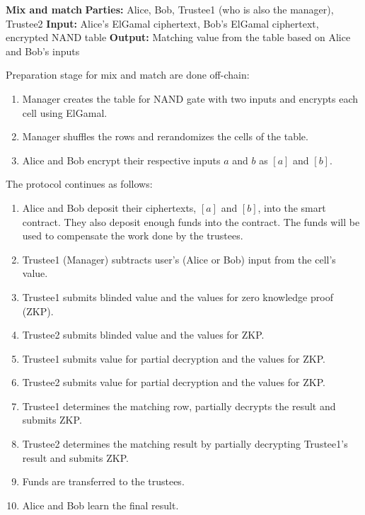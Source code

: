 \begin{mdframed}
 	\textbf{Mix and match}
 	\newline
 	 \newline
 	\textbf{Parties: } Alice, Bob, Trustee1 (who is also the manager), Trustee2 
 	 \newline
 	\textbf{Input: } Alice's ElGamal ciphertext, Bob's ElGamal ciphertext, encrypted NAND table 
 	\newline
 	\textbf{Output: } Matching value from the table based on Alice and Bob's inputs
 	\newline
 	
	Preparation stage for mix and match are done off-chain:
	\begin{enumerate}
		\item Manager creates the table for NAND gate with two inputs and encrypts each cell using ElGamal. 
		\item Manager shuffles the rows and rerandomizes the cells of the table.
		\item Alice and Bob encrypt their respective inputs $a$ and $b$ as $[a]$ and $[b]$.
	\end{enumerate}

 	The protocol continues as follows:
 	\begin{enumerate}
 		\item Alice and Bob deposit their ciphertexts, $[a]$ and $[b]$, into the smart contract. They also deposit enough funds into the contract. The funds will be used to compensate the work done by the trustees.
 		\item Trustee1 (Manager) subtracts user's (Alice or Bob) input from the cell's value.
 		\item Trustee1 submits blinded value and the values for zero knowledge proof (ZKP).
 		\item Trustee2 submits blinded value and the values for ZKP.
 		\item Trustee1 submits value for partial decryption and the values for ZKP.
 		\item Trustee2 submits value for partial decryption and the values for ZKP.
 		\item Trustee1 determines the matching row, partially decrypts the result and submits ZKP.
 		\item Trustee2  determines the matching result by partially decrypting Trustee1's result and submits ZKP.
 		\item Funds are transferred to the trustees.
 		\item Alice and Bob learn the final result.
 	\end{enumerate}
\end{mdframed}



